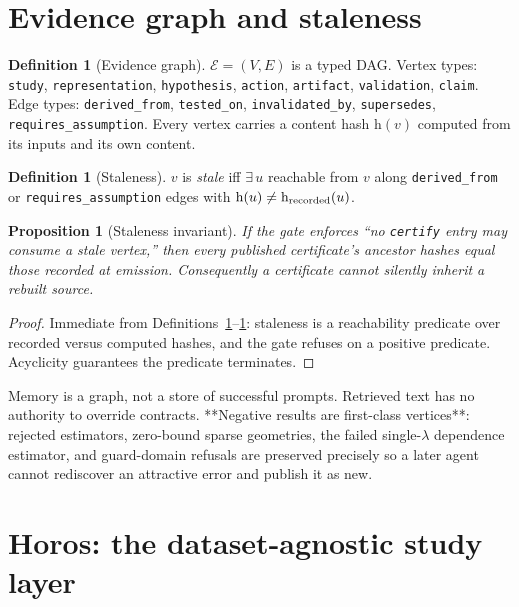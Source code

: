 \documentclass[11pt,a4paper]{article}
\newtheorem{proposition}[theorem]{Proposition}
\theoremstyle{definition}
\newtheorem{definition}[theorem]{Definition}
\theoremstyle{remark}
\newcommand{\code}[1]{\texttt{\small#1}}
\begin{document}
\section{Evidence graph and staleness}\label{sec:graph}

\begin{definition}[Evidence graph]\label{def:graph}
$\mathcal{E}=(V,E)$ is a typed DAG. Vertex types: \code{study}, \code{representation}, \code{hypothesis}, \code{action}, \code{artifact}, \code{validation}, \code{claim}. Edge types: \code{derived\_from}, \code{tested\_on}, \code{invalidated\_by}, \code{supersedes}, \code{requires\_assumption}. Every vertex carries a content hash $\mathrm{h}(v)$ computed from its inputs and its own content.
\end{definition}

\begin{definition}[Staleness]\label{def:stale}
$v$ is \emph{stale} iff $\exists\,u$ reachable from $v$ along \code{derived\_from} or \code{requires\_assumption} edges with $\mathrm{h}(u)\ne\mathrm{h}_{\rm recorded}(u)$.
\end{definition}

\begin{proposition}[Staleness invariant]\label{prop:stale}
If the gate enforces ``no \code{certify} entry may consume a stale vertex,'' then every published certificate's ancestor hashes equal those recorded at emission. Consequently a certificate cannot silently inherit a rebuilt source.
\end{proposition}
\begin{proof}
Immediate from Definitions~\ref{def:graph}--\ref{def:stale}: staleness is a reachability predicate over recorded versus computed hashes, and the gate refuses on a positive predicate. Acyclicity guarantees the predicate terminates. \end{proof}

Memory is a graph, not a store of successful prompts. Retrieved text has no authority to override contracts. **Negative results are first-class vertices**: rejected estimators, zero-bound sparse geometries, the failed single-$\lambda$ dependence estimator, and guard-domain refusals are preserved precisely so a later agent cannot rediscover an attractive error and publish it as new.

\section{Horos: the dataset-agnostic study layer}\label{sec:horos}
\end{document}
